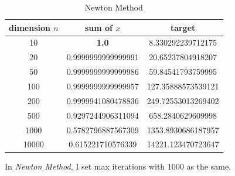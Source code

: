 \documentclass[12pt, a4paper, oneside]{article}
\begin{document}
\begin{table}[H]
    \begin{center}
      \caption{Newton Method}
      \begin{tabular}{c|c|c} %
        \textbf{dimension $n$} & \textbf{sum of $x$} & \textbf{target}\\
        \hline
        10 & \textbf{1.0} & 8.330292239712175 \\
        20 & 0.9999999999999991 & 20.65237804918207 \\
        50 & 0.9999999999999986 & 59.84541793759995 \\
        100 & 0.9999999999999957 & 127.35888573539121 \\
        200 & 0.9999941080478836 & 249.72553013269402 \\
        500 & 0.9297244906311094 & 658.2840629609998 \\
        1000 & 0.5782796887567309 & 1353.8930686187957 \\
        10000 & 0.615221710576339 & 14221.123470723647
      \end{tabular}
    \end{center}
\end{table}
In \textit{Newton Method}, I set max iterations with $1000$ as the same.
\end{document}
